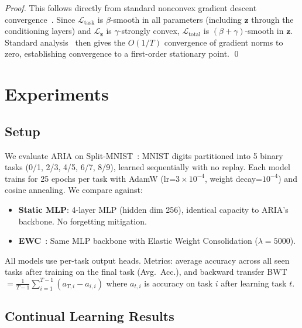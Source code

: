 \documentclass[11pt,a4paper]{article}
\theoremstyle{plain}
\theoremstyle{definition}
\theoremstyle{remark}
\begin{document}
\begin{proof}
This follows directly from standard nonconvex gradient descent convergence~\citep{nesterov2013}. Since $\mathcal{L}_\text{task}$ is $\beta$-smooth in all parameters (including $\mathbf{z}$ through the conditioning layers) and $\mathcal{L}_\mathbf{z}$ is $\gamma$-strongly convex, $\mathcal{L}_\text{total}$ is $(\beta + \gamma)$-smooth in $\mathbf{z}$. Standard analysis~\citep{nesterov2013} then gives the $O(1/T)$ convergence of gradient norms to zero, establishing convergence to a first-order stationary point. \qed
\end{proof}

\section{Experiments}

\subsection{Setup}

We evaluate ARIA on Split-MNIST~\citep{lecun1989}: MNIST digits partitioned into 5 binary tasks (0/1, 2/3, 4/5, 6/7, 8/9), learned sequentially with no replay. Each model trains for 25 epochs per task with AdamW (lr=$3\times10^{-4}$, weight decay=$10^{-4}$) and cosine annealing. We compare against:

\begin{itemize}
  \item \textbf{Static MLP}: 4-layer MLP (hidden dim 256), identical capacity to ARIA's backbone. No forgetting mitigation.
  \item \textbf{EWC}~\citep{kirkpatrick2017}: Same MLP backbone with Elastic Weight Consolidation ($\lambda=5000$).
\end{itemize}

All models use per-task output heads. Metrics: average accuracy across all seen tasks after training on the final task (Avg.\ Acc.), and backward transfer BWT $= \frac{1}{T-1}\sum_{i=1}^{T-1}(a_{T,i} - a_{i,i})$ where $a_{t,i}$ is accuracy on task $i$ after learning task $t$.

\subsection{Continual Learning Results}
\end{document}
